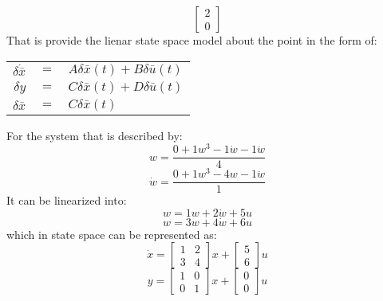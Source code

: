 \begin{enumerate}
  \label{one_equilibrium}
  \begin{equation}
    \begin{bmatrix}
2\\
0
\end{bmatrix}
\end{equation}
  That is provide the lienar state space model about the point in the form of:
  \begin{center}
    \begin{tabular}{r c l}
      $\delta \dot{\bar x}$ & $=$ & $A\delta\bar{x}(t) + B\delta\bar{u}(t)$\\
      $\delta y$ & $=$ & $C\delta\bar x(t) + D\delta\bar u(t)$\\
      $\delta \bar x$ & $=$ & $C\delta\bar x(t)$
    \end{tabular}
  \end{center}
  For the system that is described by:
  \begin{equation}
    w = \frac{0 + 1w^3 - 1\dot w - 1\ddot w}{4}
  \end{equation}
  \begin{equation}
    \dot w = \frac{0 + 1w^3 - 4w- 1\ddot w}{1}
  \end{equation}
  It can be linearized into:
  \begin{equation}
    w = 1w + 2\dot w + 5u
  \end{equation}
  \begin{equation}
    w = 3w + 4\dot w + 6u
  \end{equation}
  which in state space can be represented as:
  \begin{equation}
\dot x = \begin{bmatrix}
1 & 2\\
3 & 4
\end{bmatrix}
x + \begin{bmatrix}
5\\
6
\end{bmatrix}
u
\end{equation}
\begin{equation}
y = \begin{bmatrix}
1 & 0\\
0 & 1
\end{bmatrix}
x + \begin{bmatrix}
0\\
0
\end{bmatrix}
u
\end{equation}

\end{enumerate}
